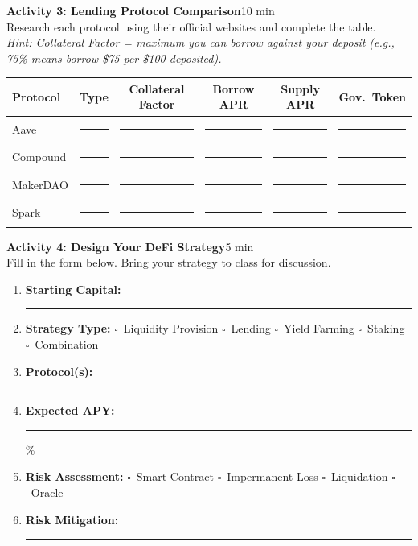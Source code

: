 \documentclass[11pt,a4paper]{article}
\newcommand{\activitybox}[3]{%
  \noindent\colorbox{mllavender4}{\parbox{\dimexpr\linewidth-2\fboxsep}{%
    \textbf{\color{mlpurple}#1}\hfill\textcolor{mlgray}{\small #2}\\[2pt]#3%
  }}\par\vspace{4pt}%
}
\newcommand{\fillcell}{\rule{2.2cm}{0.3pt}}
\begin{document}
\vspace{2pt}

\activitybox{Activity 3: Lending Protocol Comparison}{10 min}{%
Research each protocol using their official websites and complete the table.\\[2pt]
\textit{Hint: Collateral Factor = maximum you can borrow against your deposit
(e.g., 75\% means borrow \$75 per \$100 deposited).}
\begin{center}
\renewcommand{\arraystretch}{1.35}
\begin{tabular}{@{}lccccc@{}}
\toprule
\textbf{Protocol} & \textbf{Type} & \textbf{Collateral Factor} & \textbf{Borrow APR} & \textbf{Supply APR} & \textbf{Gov.\ Token} \\
\midrule
Aave     & \fillcell & \fillcell & \fillcell & \fillcell & \fillcell \\
Compound & \fillcell & \fillcell & \fillcell & \fillcell & \fillcell \\
MakerDAO & \fillcell & \fillcell & \fillcell & \fillcell & \fillcell \\
Spark    & \fillcell & \fillcell & \fillcell & \fillcell & \fillcell \\
\bottomrule
\end{tabular}
\end{center}
}

\vspace{2pt}

\activitybox{Activity 4: Design Your DeFi Strategy}{5 min}{%
Fill in the form below. Bring your strategy to class for discussion.
\begin{enumerate}
\item \textbf{Starting Capital:}~\rule{3.5cm}{0.3pt}
\item \textbf{Strategy Type:}\quad
      $\square$~Liquidity Provision\quad
      $\square$~Lending\quad
      $\square$~Yield Farming\quad
      $\square$~Staking\quad
      $\square$~Combination
\item \textbf{Protocol(s):}~\rule{4cm}{0.3pt}
\item \textbf{Expected APY:}~\rule{2cm}{0.3pt}\%
\item \textbf{Risk Assessment:}\quad
      $\square$~Smart Contract\quad
      $\square$~Impermanent Loss\quad
      $\square$~Liquidation\quad
      $\square$~Oracle
\item \textbf{Risk Mitigation:}~\rule{6cm}{0.3pt}
\end{enumerate}
}
\end{document}
